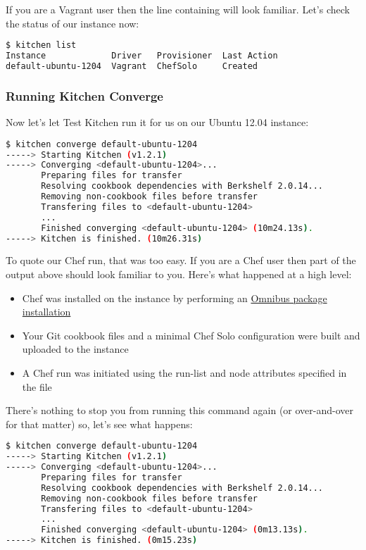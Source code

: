 If you are a Vagrant user then the line containing  will look familiar. Let's check the status of our instance now:

\begin{lstlisting}[language=Bash,label=lst:testing-test-kitchen8]
$ kitchen list
Instance             Driver   Provisioner  Last Action
default-ubuntu-1204  Vagrant  ChefSolo     Created
\end{lstlisting}





\subsubsection{Running Kitchen Converge}

Now let's let Test Kitchen run it for us on our Ubuntu 12.04 instance:

\begin{lstlisting}[language=Bash,label=lst:testing-test-kitchen9]
$ kitchen converge default-ubuntu-1204
-----> Starting Kitchen (v1.2.1)
-----> Converging <default-ubuntu-1204>...
       Preparing files for transfer
       Resolving cookbook dependencies with Berkshelf 2.0.14...
       Removing non-cookbook files before transfer
       Transfering files to <default-ubuntu-1204>
       ...
       Finished converging <default-ubuntu-1204> (10m24.13s).
-----> Kitchen is finished. (10m26.31s)
\end{lstlisting}

To quote our Chef run, that was too easy. If you are a Chef user then part of the output above should look familiar to you. Here's what happened at a high level:

\begin{itemize}
  \item Chef was installed on the instance by performing an \href{http://www.opscode.com/chef/install/}{Omnibus package installation}
  \item Your Git cookbook files and a minimal Chef Solo configuration were built and uploaded to the instance
  \item A Chef run was initiated using the run-list and node attributes specified in the  file
\end{itemize}

There's nothing to stop you from running this command again (or over-and-over for that matter) so, let's see what happens:

\begin{lstlisting}[language=Bash,label=lst:testing-test-kitchen10]
$ kitchen converge default-ubuntu-1204
-----> Starting Kitchen (v1.2.1)
-----> Converging <default-ubuntu-1204>...
       Preparing files for transfer
       Resolving cookbook dependencies with Berkshelf 2.0.14...
       Removing non-cookbook files before transfer
       Transfering files to <default-ubuntu-1204>
       ...
       Finished converging <default-ubuntu-1204> (0m13.13s).
-----> Kitchen is finished. (0m15.23s)
\end{lstlisting}

